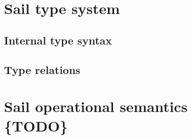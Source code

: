 \documentclass[11pt]{article}
\begin{document}
\ottgrammartabular{
\ottbuiltXXinXXtypes\ottinterrule}

\ottgrammartabular{
\ottbuiltXXinXXtypeXXabbreviations\ottinterrule
\ottfunctions\ottinterrule
\ottfunctionsXXwithXXcoercions\ottinterrule}
\newpage

\section{Sail type system}

\subsection{Internal type syntax}

\ottgrammartabular{
\ottk\ottinterrule
\ottt\ottinterrule
\ottoptx\ottinterrule
\otttag\ottinterrule
\ottne\ottinterrule
\otttXXarg\ottinterrule
\otttXXargs\ottinterrule
\ottnec\ottinterrule
\ottSXXN\ottinterrule
\ottEXXd\ottinterrule
\ottkinf\ottinterrule
\otttid\ottinterrule
\ottEXXk\ottinterrule
\otttinf\ottinterrule
\ottEXXa\ottinterrule
\ottfieldXXtyps\ottinterrule
\ottEXXr\ottinterrule
\ottenumerateXXmap\ottinterrule
\ottEXXe\ottinterrule
\ottEXXt\ottinterrule
\ottts\ottinterrule
\ottE\ottinterrule
\ottI\ottinterrule
\ottformula\ottinterrule}


\subsection{ Type relations }
\ottdefnss

\section{Sail operational semantics \{TODO\}}
\end{document}
